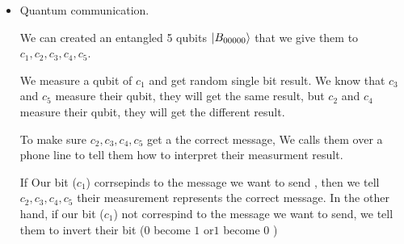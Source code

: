 \documentclass[12pt, a4paper]{article}
\begin{document}
\begin{enumerate}
		\begin{itemize}
			\item Quantum communication.
			
			We can created an entangled 5 qubits $\ket{B_{00000} }$ that we give them to $c_1, c_2, c_3, c_4, c_5$.
			
			We measure a qubit of $c_1$ and get random single bit result. We know that $c_3$ and $c_5$ measure their qubit, they will get the same result, but $c_2$ and $c_4$ measure their qubit, they will get the different result.
			
			To make sure $c_2,  c_3, c_4, c_5$ get a the correct message, We calls them over a phone line to tell them how to interpret their measurment result.
			
			If Our bit ($c_1$) corrsepinds to the message we want to send , then we tell $c_2,  c_3, c_4, c_5$ their measurement represents the correct message. In the other hand, if our bit ($c_1$) not correspind to the message we want to send, we tell them to invert their bit ($0$ become $1$ or$1$ become $0$ )
		\end{itemize}
	\end{enumerate}
\end{document}
